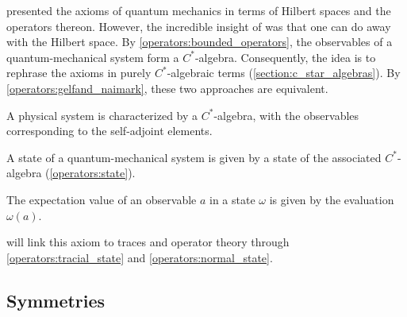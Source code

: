      presented the axioms of quantum mechanics in terms of Hilbert spaces and the operators thereon. However, the incredible insight of  was that one can do away with the Hilbert space. By \cref{operators:bounded_operators}, the observables of a quantum-mechanical system form a $C^*$-algebra. Consequently, the idea is to rephrase the axioms in purely $C^*$-algebraic terms (\cref{section:c_star_algebras}). By \cref{operators:gelfand_naimark}, these two approaches are equivalent.

    \begin{axiom}[Observables]
        A physical system is characterized by a $C^*$-algebra, with the observables corresponding to the self-adjoint elements.
    \end{axiom}

    \begin{axiom}[States]
        A state of a quantum-mechanical system is given by a state of the associated $C^*$-algebra (\cref{operators:state}).
    \end{axiom}

    \begin{axiom}
        The expectation value of an observable $a$ in a state $\omega$ is given by the evaluation $\omega(a)$.
    \end{axiom}
    \begin{remark}
         will link this axiom to traces and operator theory through \cref{operators:tracial_state} and \cref{operators:normal_state}.
    \end{remark}

    \begin{axiom}[Projection]
        
    \end{axiom}

    \begin{axiom}

    \end{axiom}


\subsection{Symmetries}

